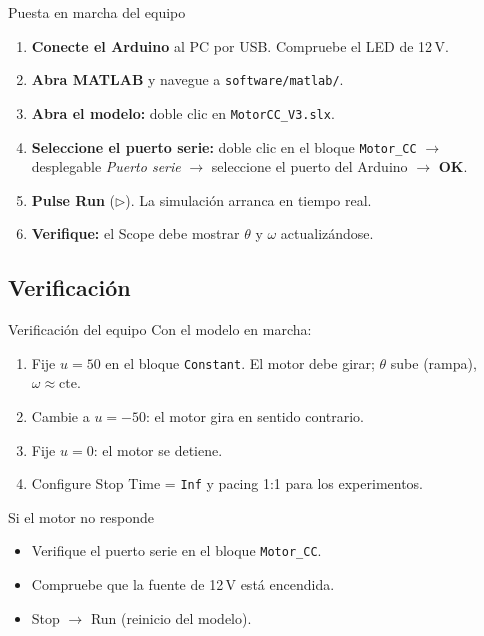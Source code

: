 \documentclass{beamer}
\begin{document}
\begin{frame}{Puesta en marcha del equipo}
\begin{enumerate}
  \item \textbf{Conecte el Arduino} al PC por USB. Compruebe el LED de 12\,V.
  \item \textbf{Abra MATLAB} y navegue a \texttt{software/matlab/}.
  \item \textbf{Abra el modelo:} doble clic en \texttt{MotorCC\_V3.slx}.
  \item \textbf{Seleccione el puerto serie:}
        doble clic en el bloque \texttt{Motor\_CC} $\to$ desplegable
        \emph{Puerto serie} $\to$ seleccione el puerto del Arduino $\to$ \textbf{OK}.
  \item \textbf{Pulse Run} ($\triangleright$). La simulación arranca en tiempo real.
  \item \textbf{Verifique:} el Scope debe mostrar $\theta$ y $\omega$ actualizándose.
\end{enumerate}
\end{frame}

\subsection{Verificación}

\begin{frame}{Verificación del equipo}
Con el modelo en marcha:
\begin{enumerate}
  \item Fije $u = 50$ en el bloque \texttt{Constant}. El motor debe girar;
        $\theta$ sube (rampa), $\omega \approx \text{cte.}$
  \item Cambie a $u = -50$: el motor gira en sentido contrario.
  \item Fije $u = 0$: el motor se detiene.
  \item Configure Stop Time = \texttt{Inf} y pacing 1:1 para los experimentos.
\end{enumerate}
\begin{alertblock}{Si el motor no responde}
  \begin{itemize}
    \item Verifique el puerto serie en el bloque \texttt{Motor\_CC}.
    \item Compruebe que la fuente de 12\,V está encendida.
    \item Stop $\to$ Run (reinicio del modelo).
  \end{itemize}
\end{alertblock}
\end{frame}
\end{document}
